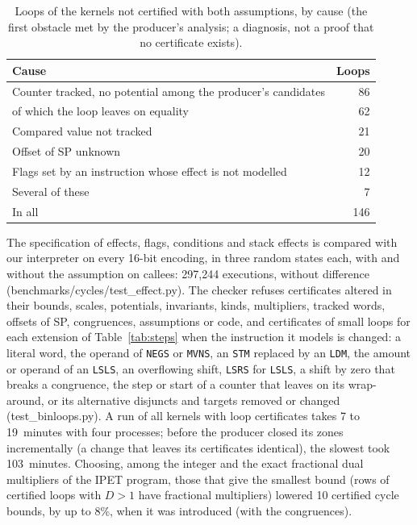 \documentclass[oneside,english]{amsart}
\numberwithin{equation}{section}
\theoremstyle{plain}
\theoremstyle{definition}
\theoremstyle{plain}
\theoremstyle{plain}
\theoremstyle{remark}
\newcommand{\lean}[1]{{\ttfamily\small #1}}
\begin{document}
\begin{table}[ht]
\centering
\small
\begin{tabular}{@{}lr@{}}
\toprule
Cause & Loops \\
\midrule
Counter tracked, no potential among the producer's candidates & 86 \\
\quad of which the loop leaves on equality & 62 \\
Compared value not tracked & 21 \\
Offset of SP unknown & 20 \\
Flags set by an instruction whose effect is not modelled & 12 \\
Several of these & 7 \\
\midrule
In all & 146 \\
\bottomrule
\end{tabular}
\caption{Loops of the kernels not certified with both assumptions, by cause (the first obstacle met by the producer's analysis; a diagnosis, not a proof that no certificate exists).}
\label{tab:fail}
\end{table}

The specification of effects, flags, conditions and stack effects is compared with our interpreter on every 16-bit encoding, in three random states each, with and without the assumption on callees: 297{,}244 executions, without difference (\lean{benchmarks/cycles/test\_effect.py}). The checker refuses certificates altered in their bounds, scales, potentials, invariants, kinds, multipliers, tracked words, offsets of SP, congruences, assumptions or code, and certificates of small loops for each extension of Table~\ref{tab:steps} when the instruction it models is changed: a literal word, the operand of \texttt{NEGS} or \texttt{MVNS}, an \texttt{STM} replaced by an \texttt{LDM}, the amount or operand of an \texttt{LSLS}, an overflowing shift, \texttt{LSRS} for \texttt{LSLS}, a shift by zero that breaks a congruence, the step or start of a counter that leaves on its wrap-around, or its alternative disjuncts and targets removed or changed (\lean{test\_binloops.py}). A run of all kernels with loop certificates takes 7 to 19~minutes with four processes; before the producer closed its zones incrementally (a change that leaves its certificates identical), the slowest took 103~minutes. Choosing, among the integer and the exact fractional dual multipliers of the IPET program, those that give the smallest bound (rows of certified loops with $D > 1$ have fractional multipliers) lowered 10 certified cycle bounds, by up to 8\%, when it was introduced (with the congruences).
\end{document}
